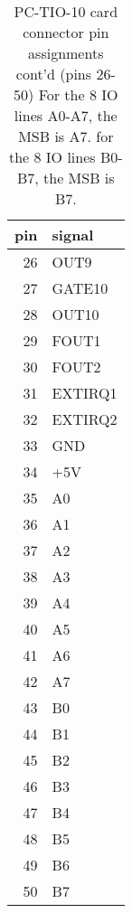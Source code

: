   
\begin{table}
\begin{center}
\begin{tabular}{|r|l|}
\hline
pin & signal\\ \hline
26 & OUT9 \\ 
27 & GATE10 \\
28 & OUT10\\
29 & FOUT1 \\
30 & FOUT2\\
31 & EXTIRQ1\\
32 & EXTIRQ2\\
33 & GND\\
34 & +5V\\
35 & A0\\
36 & A1\\
37 & A2\\
38 & A3\\
39 & A4\\
40 & A5\\
41 & A6\\
42 & A7\\
43 & B0\\
44 & B1\\
45 & B2\\
46 & B3\\
47 & B4\\
48 & B5\\
49 & B6\\
50 & B7\\
\hline
\end{tabular}
\caption[PC-TIO-10 card connector pin assignments cont'd (pins 26-50)]
        {PC-TIO-10 card connector pin assignments cont'd (pins 26-50)
         For the 8 IO lines A0-A7, the MSB is A7.  for the 8 IO lines
         B0-B7, the MSB is B7.
        }
\end{center}
\end{table}
  
\newpage
